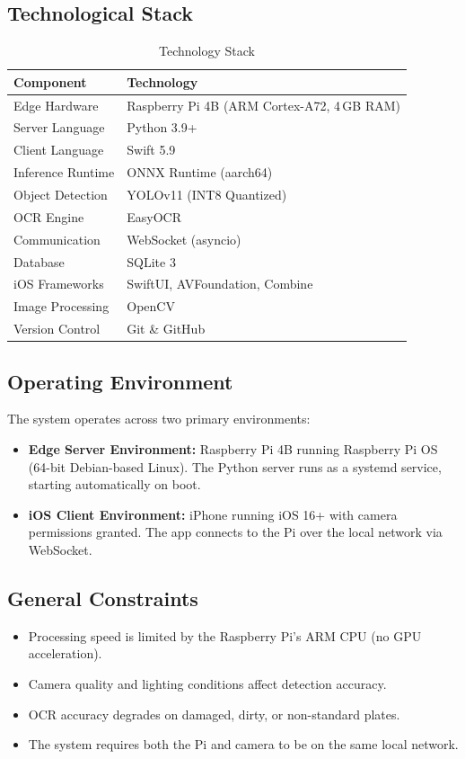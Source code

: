 \documentclass[11pt]{report}
\begin{document}
\subsection{Technological Stack}
\begin{table}[H]
\centering
\caption{Technology Stack}
\renewcommand{\arraystretch}{1.3}
\begin{tabular}{|l|l|}
\hline
\textbf{Component} & \textbf{Technology} \\
\hline
Edge Hardware & Raspberry Pi 4B (ARM Cortex-A72, 4\,GB RAM) \\
\hline
Server Language & Python 3.9+ \\
\hline
Client Language & Swift 5.9 \\
\hline
Inference Runtime & ONNX Runtime (aarch64) \\
\hline
Object Detection & YOLOv11 (INT8 Quantized) \\
\hline
OCR Engine & EasyOCR \\
\hline
Communication & WebSocket (asyncio) \\
\hline
Database & SQLite 3 \\
\hline
iOS Frameworks & SwiftUI, AVFoundation, Combine \\
\hline
Image Processing & OpenCV \\
\hline
Version Control & Git \& GitHub \\
\hline
\end{tabular}
\end{table}

\subsection{Operating Environment}
The system operates across two primary environments:
\begin{itemize}
    \item \textbf{Edge Server Environment:} Raspberry Pi 4B running Raspberry Pi OS (64-bit Debian-based Linux). The Python server runs as a systemd service, starting automatically on boot.
    \item \textbf{iOS Client Environment:} iPhone running iOS 16+ with camera permissions granted. The app connects to the Pi over the local network via WebSocket.
\end{itemize}

\subsection{General Constraints}
\begin{itemize}
    \item Processing speed is limited by the Raspberry Pi's ARM CPU (no GPU acceleration).
    \item Camera quality and lighting conditions affect detection accuracy.
    \item OCR accuracy degrades on damaged, dirty, or non-standard plates.
    \item The system requires both the Pi and camera to be on the same local network.
\end{itemize}
\end{document}
